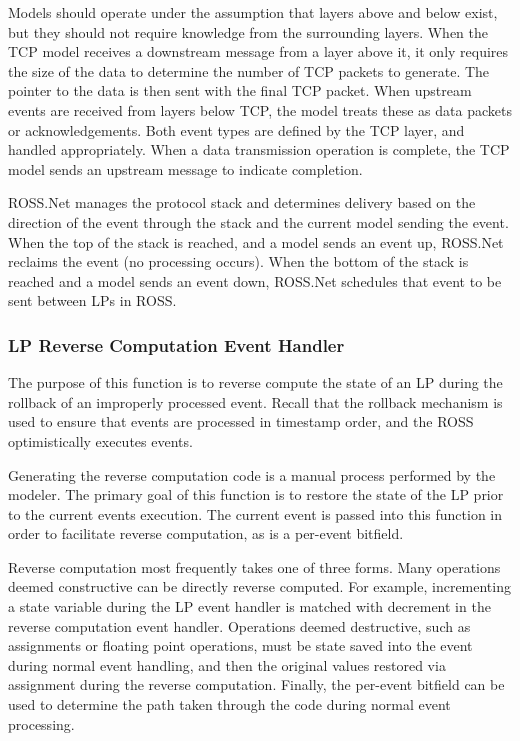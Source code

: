\documentclass[12pt]{article}
\begin{document}
Models should operate under the assumption that layers above and below exist,
but they should not require knowledge from the surrounding layers.  When the
TCP model receives a downstream message from a layer above it, it only
requires the size of the data to determine the number of TCP packets to
generate.  The pointer to the data is then sent with the final TCP packet.
When upstream events are received from layers below TCP, the model treats
these as data packets or acknowledgements.  Both event types are defined by
the TCP layer, and handled appropriately.  When a data transmission operation
is complete, the TCP model sends an upstream message to indicate completion.

ROSS.Net manages the protocol stack and determines delivery based on the
direction of the event through the stack and the current model sending the
event.  When the top of the stack is reached, and a model sends an event up,
ROSS.Net reclaims the event (no processing occurs).  When the bottom of the
stack is reached and a model sends an event down, ROSS.Net schedules that
event to be sent between LPs in ROSS.

\subsubsection{LP Reverse Computation Event Handler}

The purpose of this function is to reverse compute the state of an LP during
the rollback of an improperly processed event.  Recall that the rollback
mechanism is used to ensure that events are processed in timestamp order, and
the ROSS optimistically executes events.

Generating the reverse computation code is a manual process performed by the
modeler.  The primary goal of this function is to restore the state of the LP
prior to the current events execution.  The current event is passed into this
function in order to facilitate reverse computation, as is a per-event
bitfield.

Reverse computation most frequently takes one of three forms.  Many operations
deemed constructive can be directly reverse computed.  For example,
incrementing a state variable during the LP event handler is matched with
decrement in the reverse computation event handler.  Operations deemed
destructive, such as assignments or floating point operations, must be state
saved into the event during normal event handling, and then the original
values restored via assignment during the reverse computation.  Finally, the
per-event bitfield can be used to determine the path taken through the code
during normal event processing.
\end{document}
